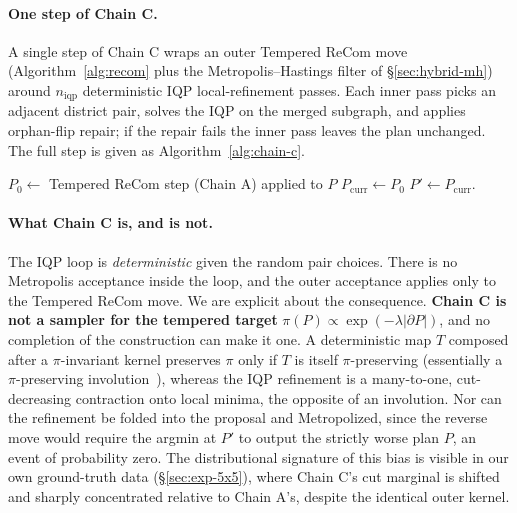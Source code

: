 \documentclass[11pt]{article}
\begin{document}
\paragraph{One step of Chain C.}\label{sec:chain-c-step}
A single step of Chain C wraps an outer Tempered ReCom move
(Algorithm~\ref{alg:recom} plus the Metropolis--Hastings filter of
\S\ref{sec:hybrid-mh}) around $n_{\mathrm{iqp}}$ deterministic
IQP local-refinement passes. Each inner pass picks an adjacent district
pair, solves the IQP on the merged subgraph, and applies orphan-flip
repair; if the repair fails the inner pass leaves the plan unchanged.
The full step is given as Algorithm~\ref{alg:chain-c}.

\begin{algorithm}[H]
\caption{One step of Chain C}\label{alg:chain-c}
$P_0 \gets $ Tempered ReCom step (Chain A) applied to $P$\;
$P_{\mathrm{curr}} \gets P_0$\;
\Return $P' \gets P_{\mathrm{curr}}$.
\end{algorithm}

\paragraph{What Chain C is, and is not.}\label{sec:chain-c-honest}
The IQP loop is \emph{deterministic} given the random pair choices. There is no Metropolis acceptance inside the loop, and the outer
acceptance applies only to the Tempered ReCom move. We are explicit
about the consequence. \textbf{Chain C is not a sampler for the
tempered target} $\pi(P) \propto \exp(-\lambda|\partial P|)$, and no
completion of the construction can make it one. A deterministic map
$T$ composed after a $\pi$-invariant kernel preserves $\pi$ only if
$T$ is itself $\pi$-preserving (essentially a $\pi$-preserving
involution~\cite{tierney1998note}), whereas the IQP refinement is a
many-to-one, cut-decreasing contraction onto local minima, the
opposite of an involution. Nor can the refinement be folded into the
proposal and Metropolized, since the reverse move would require the
argmin at $P'$ to output the strictly worse plan $P$, an event of
probability zero. The distributional signature of this bias is visible
in our own ground-truth data (\S\ref{sec:exp-5x5}), where Chain C's cut
marginal is shifted and sharply concentrated relative to Chain A's,
despite the identical outer kernel.
\end{document}
